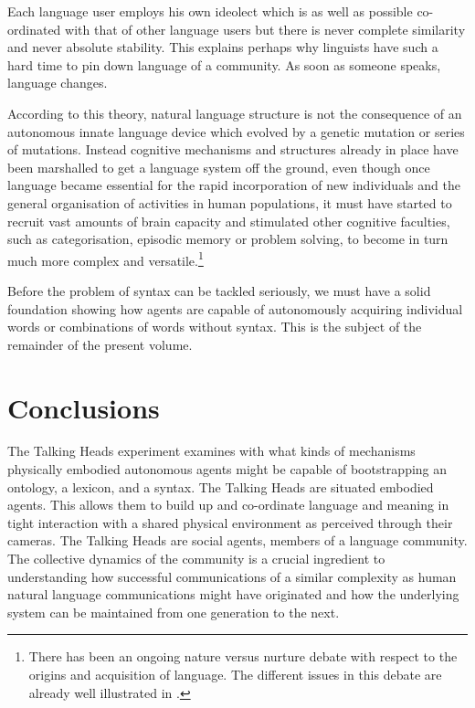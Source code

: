 Each language user employs his own ideolect which is 
as well as possible co-ordinated with that of other
language users but there is never complete similarity 
and never absolute stability.  
This explains perhaps why linguists have such a hard
time to pin down  language of a community. As soon 
as someone speaks, language changes. 

\enlargethispage{1\baselineskip}
According to this theory, natural language structure is
not the consequence of an 
autonomous innate language device which evolved 
by a genetic mutation or series of mutations. Instead 
cognitive mechanisms and structures already in place have been 
marshalled to get a language system off the ground, even though 
once language became essential for the rapid incorporation
of new individuals and the general organisation of 
activities in human populations, it must have started
to recruit vast amounts of brain capacity and stimulated 
other cognitive faculties, such as categorisation,
episodic memory or problem solving, to become in turn 
much more complex and versatile.\footnote{There has been an ongoing nature versus nurture debate 
with respect to the origins and acquisition of language. 
The different issues in this debate are already well
illustrated in \cite{Piattelli:1980}.} 

Before the problem of syntax can 
be tackled seriously, we must have a solid foundation showing 
how agents are capable of autonomously acquiring individual words
or combinations of words without syntax. This is the subject of the
remainder of the present volume.

\section{Conclusions}

The Talking Heads experiment examines with what kinds
of mechanisms physically embodied autonomous agents 
might be capable of bootstrapping an ontology, a lexicon, 
and a syntax. The Talking Heads are situated embodied
agents. This 
allows them to build up and co-ordinate language and meaning 
in tight interaction with a shared physical environment
as perceived through their cameras. 
The Talking Heads are social agents, members of a
language community. The collective
dynamics of the community is a crucial ingredient to understanding
how successful communications of a similar complexity as
human natural language communications might have 
originated and how the underlying system can 
be maintained from one generation to the next. 

